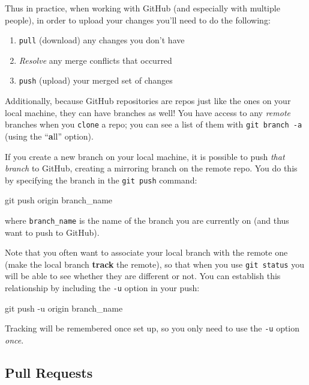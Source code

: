 \documentclass[]{book}
\newenvironment{Shaded}{\begin{snugshade}}{\end{snugshade}}
\newcommand{\FunctionTok}[1]{\textcolor[rgb]{0.00,0.00,0.00}{#1}}
\newcommand{\NormalTok}[1]{#1}
\providecommand{\tightlist}{%
  \setlength{\itemsep}{0pt}\setlength{\parskip}{0pt}}
\theoremstyle{definition}
\theoremstyle{definition}
\theoremstyle{remark}
\begin{document}
Thus in practice, when working with GitHub (and especially with multiple
people), in order to upload your changes you'll need to do the
following:

\begin{enumerate}
\def\labelenumi{\arabic{enumi}.}
\tightlist
\item
  \texttt{pull} (download) any changes you don't have
\item
  \emph{Resolve} any merge conflicts that occurred
\item
  \texttt{push} (upload) your merged set of changes
\end{enumerate}

Additionally, because GitHub repositories are repos just like the ones
on your local machine, they can have branches as well! You have access
to any \emph{remote} branches when you \texttt{clone} a repo; you can
see a list of them with \texttt{git\ branch\ -a} (using the
``\textbf{a}ll'' option).

If you create a new branch on your local machine, it is possible to push
\emph{that branch} to GitHub, creating a mirroring branch on the remote
repo. You do this by specifying the branch in the \texttt{git\ push}
command:

\begin{Shaded}
\begin{Highlighting}[]
\FunctionTok{git}\NormalTok{ push origin branch_name}
\end{Highlighting}
\end{Shaded}

where \texttt{branch\_name} is the name of the branch you are currently
on (and thus want to push to GitHub).

Note that you often want to associate your local branch with the remote
one (make the local branch \textbf{track} the remote), so that when you
use \texttt{git\ status} you will be able to see whether they are
different or not. You can establish this relationship by including the
\texttt{-u} option in your push:

\begin{Shaded}
\begin{Highlighting}[]
\FunctionTok{git}\NormalTok{ push -u origin branch_name}
\end{Highlighting}
\end{Shaded}

Tracking will be remembered once set up, so you only need to use the
\texttt{-u} option \emph{once}.

\subsection{Pull Requests}\label{pull-requests}
\end{document}
